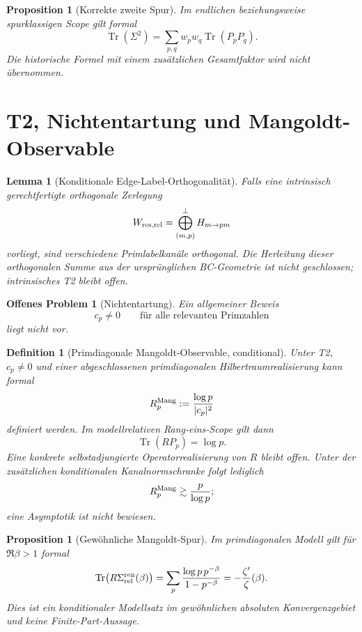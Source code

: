 \documentclass[11pt,a4paper]{amsart}
\newtheorem{proposition}[theorem]{Proposition}
\newtheorem{lemma}[theorem]{Lemma}
\newtheorem{definition}[theorem]{Definition}
\newtheorem{openproblem}[theorem]{Offenes Problem}
\newcommand{\Tr}{\operatorname{Tr}}
\begin{document}
\begin{proposition}[Korrekte zweite Spur]\label{prop:trace2}
Im endlichen beziehungsweise spurklassigen Scope gilt formal
\[
  \Tr(\Sigma^2)=\sum_{p,q}w_pw_q\Tr(P_pP_q).
\]
Die historische Formel mit einem zusätzlichen Gesamtfaktor wird nicht
übernommen.
\end{proposition}

\section{T2, Nichtentartung und Mangoldt-Observable}

\begin{lemma}[Konditionale Edge-Label-Orthogonalität]\label{lem:t2}
Falls eine intrinsisch gerechtfertigte orthogonale Zerlegung
\[
  W_{\rm res,rel}=\bigoplus_{(m,p)}^\perp H_{m\to pm}
\]
vorliegt, sind verschiedene Primlabelkanäle orthogonal. Die Herleitung dieser
orthogonalen Summe aus der ursprünglichen BC-Geometrie ist nicht geschlossen;
intrinsisches T2 bleibt offen.
\end{lemma}

\begin{openproblem}[Nichtentartung]\label{op:nonzero-cp}
Ein allgemeiner Beweis
\[
  c_p\ne0\qquad\text{für alle relevanten Primzahlen}
\]
liegt nicht vor.
\end{openproblem}

\begin{definition}[Primdiagonale Mangoldt-Observable, conditional]
\label{def:mangoldt-r}
Unter T2, $c_p\ne0$ und einer abgeschlossenen primdiagonalen
Hilbertraumrealisierung kann formal
\[
  R_p^{\rm Mang}:=\frac{\log p}{|c_p|^2}
\]
definiert werden. Im modellrelativen Rang-eins-Scope gilt dann
\[
  \Tr(RP_p)=\log p.
\]
Eine konkrete selbstadjungierte Operatorrealisierung von $R$ bleibt offen.
Unter der zusätzlichen konditionalen Kanalnormschranke folgt lediglich
\[
  R_p^{\rm Mang}\gtrsim\frac{p}{\log p};
\]
eine Asymptotik ist nicht bewiesen.
\end{definition}

\begin{proposition}[Gewöhnliche Mangoldt-Spur]\label{prop:mangoldt-trace}
Im primdiagonalen Modell gilt für $\Re\beta>1$ formal
\[
  \Tr\bigl(R\Sigma_{\rm rel}^{\rm ren}(\beta)\bigr)
  =\sum_p\frac{\log p\,p^{-\beta}}{1-p^{-\beta}}
  =-\frac{\zeta'}{\zeta}(\beta).
\]
Dies ist ein konditionaler Modellsatz im gewöhnlichen absoluten
Konvergenzgebiet und keine Finite-Part-Aussage.
\end{proposition}
\end{document}
